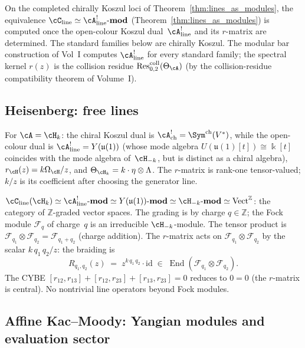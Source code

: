 On the completed chirally Koszul loci of
Theorem~\ref{thm:lines_as_modules}, the equivalence
$\cC_{\mathrm{line}}\simeq\cA^!_{\mathrm{line}}\text{-}\mathbf{mod}$
(Theorem~\ref{thm:lines_as_modules}) is computed once the
open-colour Koszul dual~$\cA^!_{\mathrm{line}}$ and its $r$-matrix
are determined. The standard families below are chirally Koszul.
The modular bar construction of Vol~I computes
$\cA^!_{\mathrm{line}}$ for every standard family; the spectral
kernel $r(z)$ is the collision residue
$\operatorname{Res}^{\mathrm{coll}}_{0,2}(\Theta_\cA)$ (by the
collision-residue compatibility theorem of Volume~I).

\subsection{Heisenberg: free lines}
\label{subsec:line-op-heisenberg}

For $\cA=\cH_k$: the chiral Koszul dual is
$\cA^!_{\mathrm{ch}}=\Sym^{\mathrm{ch}}(V^*)$, while the
open-colour dual is
$\cA^!_{\mathrm{line}}=Y(\mathfrak{u}(1))$
(whose mode algebra $U(\mathfrak{u}(1)[t]) \cong \Bbbk[t]$
coincides with the mode algebra of~$\cH_{-k}$,
but is distinct as a chiral algebra),
$r_{\cH}(z)=k\Omega_{\cH}/z$, and
$\Theta_{\cH_k}=k\cdot\eta\otimes\Lambda$.
The $r$-matrix is rank-one tensor-valued; $k/z$ is its coefficient
after choosing the generator line.

\begin{computation}
\label{comp:line-op-heisenberg}
$\cC_{\mathrm{line}}(\cH_k)
\simeq\cA^!_{\mathrm{line}}\text{-}\mathbf{mod}
\simeq Y(\mathfrak{u}(1))\text{-}\mathbf{mod}
\simeq\cH_{-k}\text{-}\mathbf{mod}
\simeq\mathrm{Vect}^{\mathbb Z}$:
the category of $\mathbb Z$-graded vector spaces. The
grading is by charge $q\in\mathbb Z$; the Fock module
$\mathcal F_q$ of charge~$q$ is an irreducible
$\cH_{-k}$-module. The tensor product is
$\mathcal F_{q_1}\otimes\mathcal F_{q_2}
=\mathcal F_{q_1+q_2}$
(charge addition). The $r$-matrix acts on
$\mathcal F_{q_1}\otimes\mathcal F_{q_2}$ by the scalar
$k\,q_1\,q_2/z$: the braiding is
\[
R_{q_1,q_2}(z)
\;=\;
z^{k\,q_1\,q_2}\cdot\mathrm{id}
\;\in\;
\operatorname{End}(\mathcal F_{q_1}\otimes\mathcal F_{q_2}).
\]
The CYBE $[r_{12},r_{13}]+[r_{12},r_{23}]+[r_{13},r_{23}]=0$
reduces to $0=0$ (the $r$-matrix is central).
No nontrivial line operators beyond Fock modules.
\end{computation}

\subsection{Affine Kac--Moody: Yangian modules and evaluation sector}
\label{subsec:line-op-affine}


